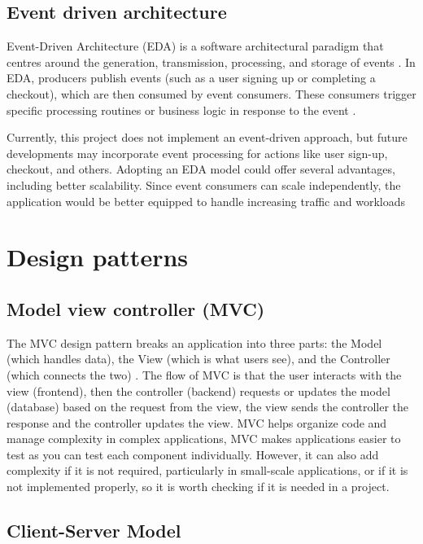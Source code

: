 \documentclass[]{project_report}
\begin{document}
\subsection{Event driven architecture}

Event-Driven Architecture (EDA) is a software architectural paradigm that centres around the generation, transmission, processing, and storage of events \cite{event_driven_architecture}. In EDA, producers publish events (such as a user signing up or completing a checkout), which are then consumed by event consumers. These consumers trigger specific processing routines or business logic in response to the event \cite{event_driven_architecture}. 

Currently, this project does not implement an event-driven approach, but future developments may incorporate event processing for actions like user sign-up, checkout, and others. Adopting an EDA model could offer several advantages, including better scalability. Since event consumers can scale independently, the application would be better equipped to handle increasing traffic and workloads


\section{Design patterns}

\subsection{Model view controller (MVC)}

The MVC design pattern breaks an application into three parts: the Model (which handles data), the View (which is what users see), and the Controller (which connects the two) \cite{mvc}. The flow of MVC is that the user interacts with the view (frontend), then the controller (backend) requests or updates the model (database) based on the request from the view, the view sends the controller the response and the controller updates the view. MVC helps organize code and manage complexity \cite{mvc} in complex applications, MVC makes applications easier to test as you can test each component individually. However, it can also add complexity if it is not required, particularly in small-scale applications, or if it is not implemented properly, so it is worth checking if it is needed in a project.

\subsection{Client-Server Model}
\end{document}
